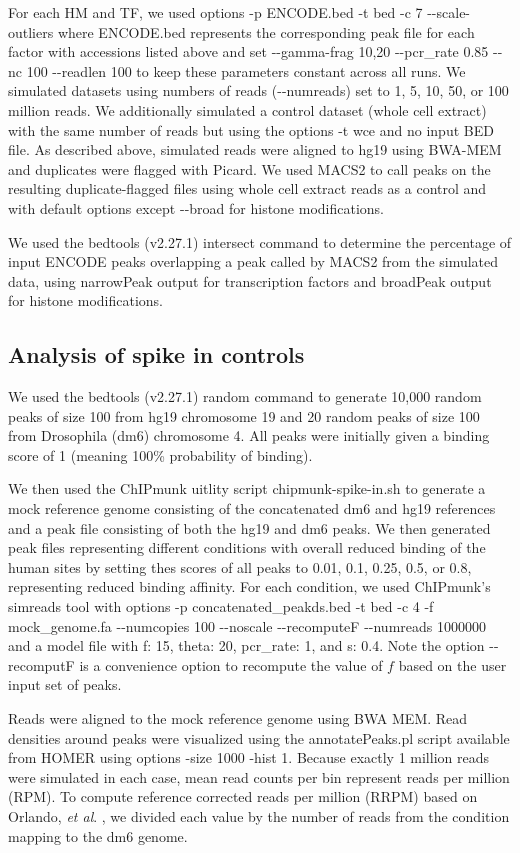 \documentclass[12pt]{article}
\begin{document}
For each HM and TF, we used options -p ENCODE.bed -t bed -c 7 -{}-scale-outliers where ENCODE.bed represents the corresponding peak file for each factor with accessions listed above and set -{}-gamma-frag 10,20 -{}-pcr\_rate 0.85 -{}-nc 100 -{}-readlen 100 to keep these parameters constant across all runs.
We simulated datasets using numbers of reads (-{}-numreads) set to 1, 5, 10, 50, or 100 million reads.
We additionally simulated a control dataset (whole cell extract) with the same number of reads but using the options -t wce and no input BED file. As described above, simulated reads were aligned to hg19 using BWA-MEM and duplicates were flagged with Picard.
We used MACS2 \cite{MACS2} to call peaks on the resulting duplicate-flagged files using whole cell extract reads as a control and with default options except -{}-broad for histone modifications.

We used the bedtools \cite{bedtools} (v2.27.1) intersect command to determine the percentage of input ENCODE peaks overlapping a peak called by MACS2 from the simulated data, using narrowPeak output for transcription factors and broadPeak output for histone modifications.

\subsection*{Analysis of spike in controls}
We used the bedtools \cite{bedtools} (v2.27.1) random command to generate 10,000 random peaks of size 100 from hg19 chromosome 19 and 20 random peaks of size 100 from Drosophila (dm6) chromosome 4. All peaks were initially given a binding score of 1 (meaning 100\% probability of binding).

We then used the ChIPmunk uitlity script chipmunk-spike-in.sh to generate a mock reference genome consisting of the concatenated dm6 and hg19 references and a peak file consisting of both the hg19 and dm6 peaks. We then generated peak files representing different conditions with overall reduced binding of the human sites by setting thes scores of all peaks to 0.01, 0.1, 0.25, 0.5, or 0.8, representing reduced binding affinity.
For each condition, we used ChIPmunk's simreads tool with options -p concatenated\_peakds.bed -t bed -c 4 -f mock\_genome.fa -{}-numcopies 100 -{}-noscale -{}-recomputeF -{}-numreads 1000000 and a model file with f: 15, theta: 20, pcr\_rate: 1, and s: 0.4. Note the option -{}-recomputF is a convenience option to recompute the value of $f$ based on the user input set of peaks.

Reads were aligned to the mock reference genome using BWA MEM. Read densities around peaks were visualized using the annotatePeaks.pl script available from HOMER \cite{HOMER} using options -size 1000 -hist 1.
Because exactly 1 million reads were simulated in each case, mean read counts per bin represent reads per million (RPM).
To compute reference corrected reads per million (RRPM) based on Orlando, \emph{et al}. \cite{spikein}, we divided each value by the number of reads from the condition mapping to the dm6 genome.



\end{document}
